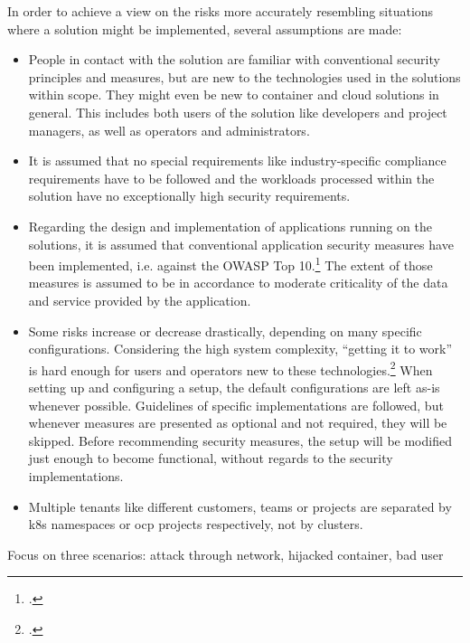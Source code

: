 In order to achieve a view on the risks more accurately resembling situations where a solution might be implemented, several assumptions are made:

\begin{itemize}

\item People in contact with the solution are familiar with conventional security principles and measures, but are new to the technologies used in the solutions within scope. They might even be new to container and cloud solutions in general. This includes both users of the solution like developers and project managers, as well as operators and administrators.

\item It is assumed that no special requirements like industry-specific compliance requirements have to be followed and the workloads processed within the solution have no exceptionally high security requirements. 

\item Regarding the design and implementation of applications running on the solutions, it is assumed that conventional application security measures have been implemented, i.e. against the OWASP Top 10.\footcite{topten} The extent of those measures is assumed to be in accordance to moderate criticality of the data and service provided by the application.

\item Some risks increase or decrease drastically, depending on many specific configurations. Considering the high system complexity, ``getting it to work'' is hard enough for users and operators new to these technologies.\footcite{hackAndHarden} When setting up and configuring a setup, the default configurations are left as-is whenever possible. Guidelines of specific implementations are followed, but whenever measures are presented as optional and not required, they will be skipped. Before recommending security measures, the setup will be modified just enough to become functional, without regards to the security implementations.

\item Multiple tenants like different customers, teams or projects are separated by \gls{k8s} namespaces or \gls{ocp} projects respectively, not by clusters.

\end{itemize}


Focus on three scenarios: attack through network, hijacked container, bad user

